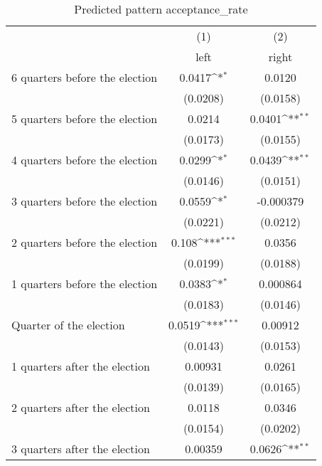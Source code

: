 \begin{table}[htbp]\centering
\def\sym#1{\ifmmode^{#1}\else\(^{#1}\)\fi}
\caption{Predicted pattern acceptance\_rate}
\begin{tabular}{l*{2}{c}}
\hline\hline
                    &\multicolumn{1}{c}{(1)}&\multicolumn{1}{c}{(2)}\\
                    &\multicolumn{1}{c}{left}&\multicolumn{1}{c}{right}\\
\hline
 6 quarters before the election&      0.0417\sym{*}  &      0.0120         \\
                    &    (0.0208)         &    (0.0158)         \\
[1em]
 5 quarters before the election&      0.0214         &      0.0401\sym{**} \\
                    &    (0.0173)         &    (0.0155)         \\
[1em]
 4 quarters before the election&      0.0299\sym{*}  &      0.0439\sym{**} \\
                    &    (0.0146)         &    (0.0151)         \\
[1em]
 3 quarters before the election&      0.0559\sym{*}  &   -0.000379         \\
                    &    (0.0221)         &    (0.0212)         \\
[1em]
 2 quarters before the election&       0.108\sym{***}&      0.0356         \\
                    &    (0.0199)         &    (0.0188)         \\
[1em]
 1 quarters before the election&      0.0383\sym{*}  &    0.000864         \\
                    &    (0.0183)         &    (0.0146)         \\
[1em]
Quarter of the election&      0.0519\sym{***}&     0.00912         \\
                    &    (0.0143)         &    (0.0153)         \\
[1em]
 1 quarters after the election&     0.00931         &      0.0261         \\
                    &    (0.0139)         &    (0.0165)         \\
[1em]
 2 quarters after the election&      0.0118         &      0.0346         \\
                    &    (0.0154)         &    (0.0202)         \\
[1em]
 3 quarters after the election&     0.00359         &      0.0626\sym{**} \\

\end{tabular}
\end{table}
